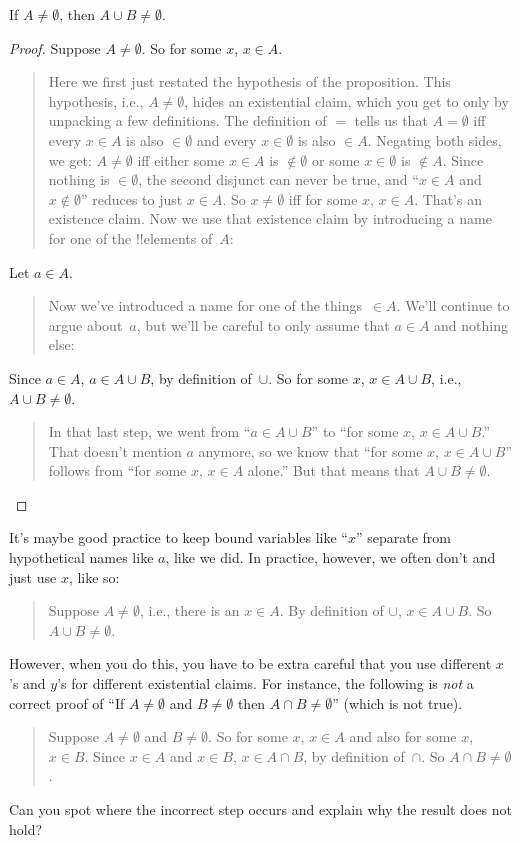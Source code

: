 \documentclass[../../../include/open-logic-section]{subfiles}
\begin{document}
\begin{prop}
If $A \neq \emptyset$, then $A \cup B \neq \emptyset$.
\end{prop}

\begin{proof}
  Suppose $A \neq \emptyset$. So for some $x$, $x \in A$. 
  \begin{quote}
    Here we first just restated the hypothesis of the
    proposition. This hypothesis, i.e., $A \neq \emptyset$, hides an
    existential claim, which you get to only by unpacking a few
    definitions. The definition of $=$ tells us that $A = \emptyset$
    iff every $x \in A$ is also $\in \emptyset$ and every $x \in
    \emptyset$ is also $\in A$. Negating both sides, we get: $A \neq
    \emptyset$ iff either some $x \in A$ is $\notin \emptyset$ or some
    $x \in \emptyset$ is $\notin A$. Since nothing is $\in \emptyset$,
    the second disjunct can never be true, and ``$x \in A$ and $x
    \notin \emptyset$'' reduces to just $x \in A$. So $x \neq
    \emptyset$ iff for some $x$, $x \in A$. That's an existence
    claim. Now we use that existence claim by introducing a name for
    one of the !!{element}s of~$A$:
  \end{quote}
  Let $a \in A$.
  \begin{quote}
    Now we've introduced a name for one of the things~$\in A$. We'll
    continue to argue about~$a$, but we'll be careful to only assume
    that $a \in A$ and nothing else:
  \end{quote}
  Since $a \in A$, $a \in A \cup B$, by definition of~$\cup$. So for
  some $x$, $x \in A \cup B$, i.e., $A \cup B \neq \emptyset$.
  \begin{quote}
    In that last step, we went from ``$a \in A \cup B$'' to ``for some
    $x$, $x \in A \cup B$.'' That doesn't mention $a$ anymore, so we
    know that ``for some $x$, $x \in A \cup B$'' follows from ``for
    some $x$, $x \in A$ alone.'' But that means that $A \cup B \neq
    \emptyset$.
  \end{quote}
\end{proof}

It's maybe good practice to keep bound variables like ``$x$'' separate
from hypothetical names like $a$, like we did. In practice, however, we
often don't and just use $x$, like so:
\begin{quote}
Suppose $A \neq \emptyset$, i.e., there is an $x \in A$. By definition
of $\cup$, $x \in A \cup B$. So $A \cup B \neq \emptyset$.
\end{quote}
However, when you do this, you have to be extra careful that you use
different $x$'s and $y$'s for different existential claims. For
instance, the following is \emph{not} a correct proof of ``If $A \neq
\emptyset$ and $B \neq \emptyset$ then $A \cap B \neq \emptyset$''
(which is not true).
\begin{quote}
Suppose $A \neq \emptyset$ and $B \neq \emptyset$. So for some $x$, $x
\in A$ and also for some $x$, $x \in B$. Since $x \in A$ and $x \in
B$, $x \in A \cap B$, by definition of~$\cap$. So $A \cap B \neq
\emptyset$.
\end{quote}
Can you spot where the incorrect step occurs and explain why the
result does not hold?
\end{document}
